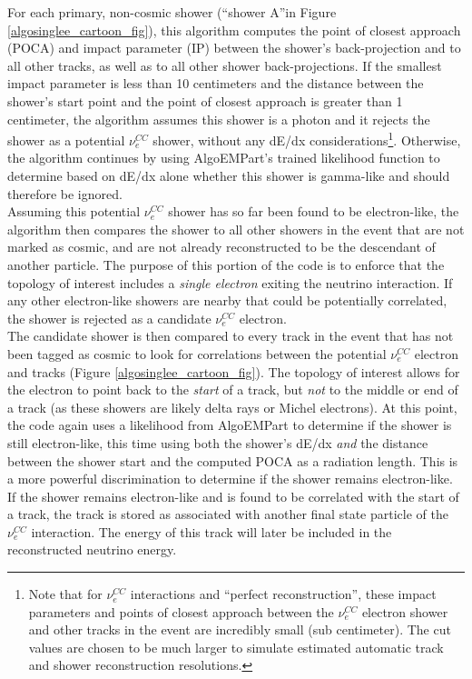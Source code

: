 For each primary, non-cosmic shower (``shower A''in Figure \ref{algosinglee_cartoon_fig}), this algorithm computes the point of closest approach (POCA) and impact parameter (IP) between the shower's back-projection and to all other tracks, as well as to all other shower back-projections. If the smallest impact parameter is less than 10 centimeters and the distance between the shower's start point and the point of closest approach is greater than 1 centimeter, the algorithm assumes this shower is a photon and it rejects the shower as a potential $\nu_e^{CC}$ shower, without any dE/dx considerations\footnote{Note that for $\nu_e^{CC}$ interactions and ``perfect reconstruction'', these impact parameters and points of closest approach between the $\nu_e^{CC}$ electron shower and other tracks in the event are incredibly small (sub centimeter). The cut values are chosen to be much larger to simulate estimated automatic track and shower reconstruction resolutions.}. Otherwise, the algorithm continues by using AlgoEMPart's trained likelihood function to determine based on dE/dx alone whether this shower is gamma-like and should therefore be ignored.\\

Assuming this potential $\nu_e^{CC}$ shower has so far been found to be electron-like, the algorithm then compares the shower to all other showers in the event that are not marked as cosmic, and are not already reconstructed to be the descendant of another particle. The purpose of this portion of the code is to enforce that the topology of interest includes a \textit{single electron} exiting the neutrino interaction. If any other electron-like showers are nearby that could be potentially correlated, the shower is rejected as a candidate $\nu_e^{CC}$ electron.\\

The candidate shower is then compared to every track in the event that has not been tagged as cosmic to look for correlations between the potential $\nu_e^{CC}$ electron and tracks (Figure \ref{algosinglee_cartoon_fig}). The topology of interest allows for the electron to point back to the \textit{start} of a track, but \textit{not} to the middle or end of a track (as these showers are likely delta rays or Michel electrons). At this point, the code again uses a likelihood from AlgoEMPart to determine if the shower is still electron-like, this time using both the shower's dE/dx \textit{and} the distance between the shower start and the computed POCA as a radiation length. This is a more powerful discrimination to determine if the shower remains electron-like. If the shower remains electron-like and is found to be correlated with the start of a track, the track is stored as associated with another final state particle of the $\nu_e^{CC}$ interaction. The energy of this track will later be included in the reconstructed neutrino energy.\\

